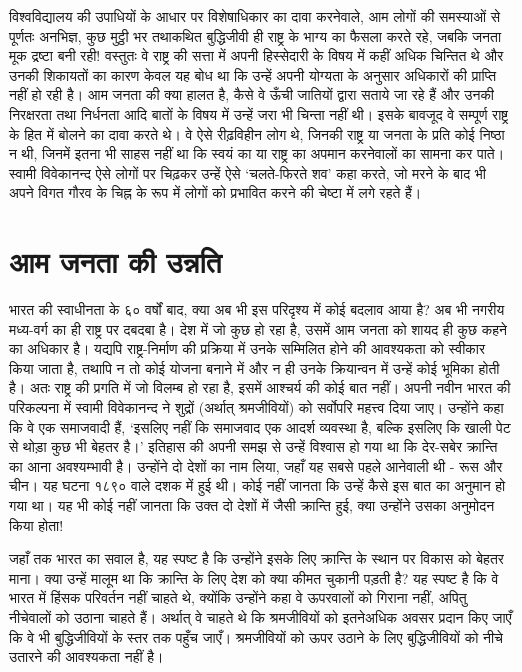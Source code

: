विश्वविद्यालय की उपाधियों के आधार पर विशेषाधिकार का दावा करनेवाले, आम लोगों की समस्याओं से पूर्णतः अनभिज्ञ, कुछ मुट्ठी भर तथाकथित बुद्धिजीवी ही राष्ट्र के भाग्य का फैसला करते रहे, जबकि जनता मूक द्रष्टा बनी रही! वस्तुतः वे राष्ट्र की सत्ता में अपनी हिस्सेदारी के विषय में कहीं अधिक चिन्तित थे और उनकी शिकायतों का कारण केवल यह बोध था कि उन्हें अपनी योग्यता के अनुसार अधिकारों की प्राप्ति नहीं हो रही है। आम जनता की क्या हालत है, कैसे वे ऊँची जातियों द्वारा सताये जा रहे हैं और उनकी निरक्षरता तथा निर्धनता आदि बातों के विषय में उन्हें जरा भी चिन्ता नहीं थी। इसके बावजूद वे सम्पूर्ण राष्ट्र के हित में बोलने का दावा करते थे। वे ऐसे रीढ़विहीन लोग थे, जिनकी राष्ट्र या जनता के प्रति कोई निष्ठा न थी, जिनमें इतना भी साहस नहीं था कि स्वयं का या राष्ट्र का अपमान करनेवालों का सामना कर पाते। स्वामी विवेकानन्द ऐसे लोगों पर चिढ़कर उन्हें ऐसे ‘चलते-फिरते शव’ कहा करते, जो मरने के बाद भी अपने विगत गौरव के चिह्न के रूप में लोगों को प्रभावित करने की चेष्टा में लगे रहते हैं।


\section*{आम जनता की उन्नति}

भारत की स्वाधीनता के ६० वर्षों बाद, क्या अब भी इस परिदृश्य में कोई बदलाव आया है? अब भी नगरीय मध्य-वर्ग का ही राष्ट्र पर दबदबा है। देश में जो कुछ हो रहा है, उसमें आम जनता को शायद ही कुछ कहने का अधिकार है। यद्यपि राष्ट्र-निर्माण की प्रक्रिया में उनके सम्मिलित होने की आवश्यकता को स्वीकार किया जाता है, तथापि न तो कोई योजना बनाने में और न ही उनके क्रियान्वन में उन्हें कोई भूमिका होती है। अतः राष्ट्र की प्रगति में जो विलम्ब हो रहा है, इसमें आश्चर्य की कोई बात नहीं। अपनी नवीन भारत की परिकल्पना में स्वामी विवेकानन्द ने शुद्रों (अर्थात् श्रमजीवियों) को सर्वोपरि महत्त्व दिया जाए। उन्होंने कहा कि वे एक समाजवादी हैं, ‘इसलिए नहीं कि समाजवाद एक आदर्श व्यवस्था है, बल्कि इसलिए कि खाली पेट से थोड़ा कुछ भी बेहतर है।’ इतिहास की अपनी समझ से उन्हें विश्वास हो गया था कि देर-सबेर क्रान्ति का आना अवश्यम्भावी है। उन्होंने दो देशों का नाम लिया, जहाँ यह सबसे पहले आनेवाली थी - रूस और चीन। यह घटना १८९० वाले दशक में हुई थी। कोई नहीं जानता कि उन्हें कैसे इस बात का अनुमान हो गया था। यह भी कोई नहीं जानता कि उक्त दो देशों में जैसी क्रान्ति हुई, क्या उन्होंने उसका अनुमोदन किया होता! 

{जहाँ तक भारत का सवाल है, यह स्पष्ट है कि उन्होंने इसके लिए क्रान्ति के स्थान पर विकास को बेहतर माना। क्या उन्हें मालूम था कि क्रान्ति के लिए देश को क्या कीमत चुकानी पड़ती है? यह स्पष्ट है कि वे भारत में हिंसक परिवर्तन नहीं चाहते थे, क्योंकि उन्होंने कहा वे ऊपरवालों को गिराना नहीं, अपितु नीचेवालों को उठाना चाहते हैं। अर्थात् वे चाहते थे कि श्रमजीवियों को इतने\parfillskip=0pt}\newpage\noindent अधिक अवसर प्रदान किए जाएँ कि वे भी बुद्धिजीवियों के स्तर तक पहुँच जाएँ। श्रमजीवियों को ऊपर उठाने के लिए बुद्धिजीवियों को नीचे उतारने की आवश्यकता नहीं है।


